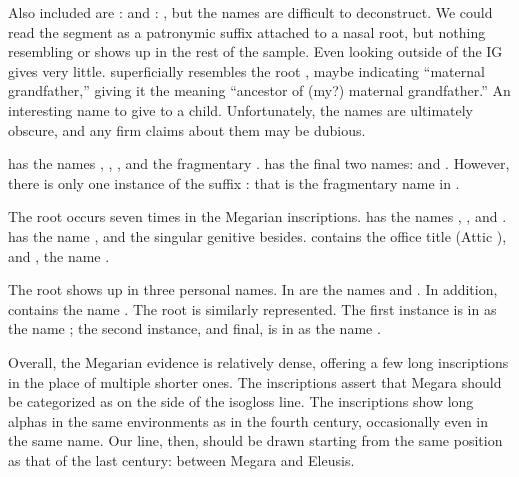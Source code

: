 Also included are :
 and :
,
but the names are difficult to deconstruct.
We could read the segment  as a patronymic suffix attached to a nasal root,
but nothing resembling  or  shows up in the rest of the sample.
Even looking outside of the IG gives very little.
 superficially resembles the root ,
maybe indicating  ``maternal grandfather,''
giving it the meaning ``ancestor of (my?) maternal grandfather.''
An interesting name to give to a child.
Unfortunately,
the names are ultimately obscure,
and any firm claims about them may be dubious.

 has the names ,
,
,
and the fragmentary .
 has the final two names: 
and .
However, there is only one instance of the suffix :
that is the fragmentary name  in .

The root  occurs seven times in the Megarian inscriptions.
 has the names ,
,
and .
 has the name ,
and the singular genitive  besides.
 contains the office title  (Attic ),
and ,
the name .

The root  shows up in three personal names.
In  are the names  and .
In addition,
 contains the name .
The root  is similarly represented.
The first instance is in  as the name ;
the second instance,
and final,
is in  as the name .

Overall,
the Megarian evidence is relatively dense,
offering a few long inscriptions in the place of multiple shorter ones.
The inscriptions assert that Megara should be categorized as on the  side of the isogloss line.
The inscriptions show long alphas in the same environments as in the fourth century,
occasionally even in the same name.
Our line,
then,
should be drawn starting from the same position as that of the last century: between Megara and Eleusis.

